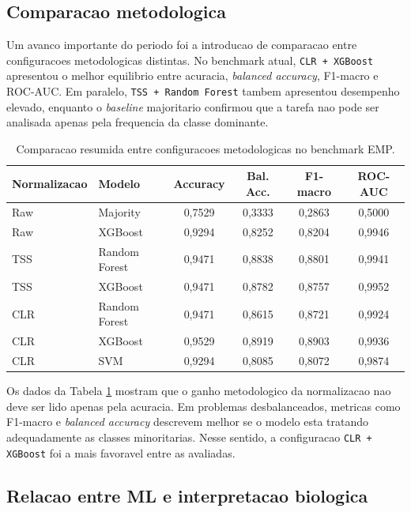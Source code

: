 \documentclass[12pt,a4paper]{article}
\begin{document}
\subsection{Comparacao metodologica}

Um avanco importante do periodo foi a introducao de comparacao entre configuracoes metodologicas distintas. No benchmark atual, \texttt{CLR + XGBoost} apresentou o melhor equilibrio entre acuracia, \textit{balanced accuracy}, F1-macro e ROC-AUC. Em paralelo, \texttt{TSS + Random Forest} tambem apresentou desempenho elevado, enquanto o \textit{baseline} majoritario confirmou que a tarefa nao pode ser analisada apenas pela frequencia da classe dominante.

\begin{table}[H]
    \centering
    \caption{Comparacao resumida entre configuracoes metodologicas no benchmark EMP.}
    \label{tab:benchmark_emp}
    \begin{tabular}{>{\raggedright\arraybackslash}p{2.4cm} >{\raggedright\arraybackslash}p{3.0cm} c c c c}
        \toprule
        \textbf{Normalizacao} & \textbf{Modelo} & \textbf{Accuracy} & \textbf{Bal. Acc.} & \textbf{F1-macro} & \textbf{ROC-AUC} \\
        \midrule
        Raw & Majority & 0,7529 & 0,3333 & 0,2863 & 0,5000 \\
        Raw & XGBoost & 0,9294 & 0,8252 & 0,8204 & 0,9946 \\
        TSS & Random Forest & 0,9471 & 0,8838 & 0,8801 & 0,9941 \\
        TSS & XGBoost & 0,9471 & 0,8782 & 0,8757 & 0,9952 \\
        CLR & Random Forest & 0,9471 & 0,8615 & 0,8721 & 0,9924 \\
        CLR & XGBoost & 0,9529 & 0,8919 & 0,8903 & 0,9936 \\
        CLR & SVM & 0,9294 & 0,8085 & 0,8072 & 0,9874 \\
        \bottomrule
    \end{tabular}
\end{table}

Os dados da Tabela \ref{tab:benchmark_emp} mostram que o ganho metodologico da normalizacao nao deve ser lido apenas pela acuracia. Em problemas desbalanceados, metricas como F1-macro e \textit{balanced accuracy} descrevem melhor se o modelo esta tratando adequadamente as classes minoritarias. Nesse sentido, a configuracao \texttt{CLR + XGBoost} foi a mais favoravel entre as avaliadas.

\subsection{Relacao entre ML e interpretacao biologica}
\end{document}
